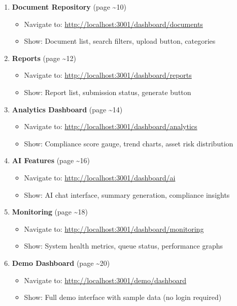\documentclass[11pt,a4paper]{article}
\begin{document}
\begin{enumerate}[itemsep=0.5em]
    \item \textbf{Document Repository} (page \textasciitilde10)
    \begin{itemize}
        \item Navigate to: \url{http://localhost:3001/dashboard/documents}
        \item Show: Document list, search filters, upload button, categories
    \end{itemize}

    \item \textbf{Reports} (page \textasciitilde12)
    \begin{itemize}
        \item Navigate to: \url{http://localhost:3001/dashboard/reports}
        \item Show: Report list, submission status, generate button
    \end{itemize}

    \item \textbf{Analytics Dashboard} (page \textasciitilde14)
    \begin{itemize}
        \item Navigate to: \url{http://localhost:3001/dashboard/analytics}
        \item Show: Compliance score gauge, trend charts, asset risk distribution
    \end{itemize}

    \item \textbf{AI Features} (page \textasciitilde16)
    \begin{itemize}
        \item Navigate to: \url{http://localhost:3001/dashboard/ai}
        \item Show: AI chat interface, summary generation, compliance insights
    \end{itemize}

    \item \textbf{Monitoring} (page \textasciitilde18)
    \begin{itemize}
        \item Navigate to: \url{http://localhost:3001/dashboard/monitoring}
        \item Show: System health metrics, queue status, performance graphs
    \end{itemize}

    \item \textbf{Demo Dashboard} (page \textasciitilde20)
    \begin{itemize}
        \item Navigate to: \url{http://localhost:3001/demo/dashboard}
        \item Show: Full demo interface with sample data (no login required)
    \end{itemize}
\end{enumerate}
\end{document}
